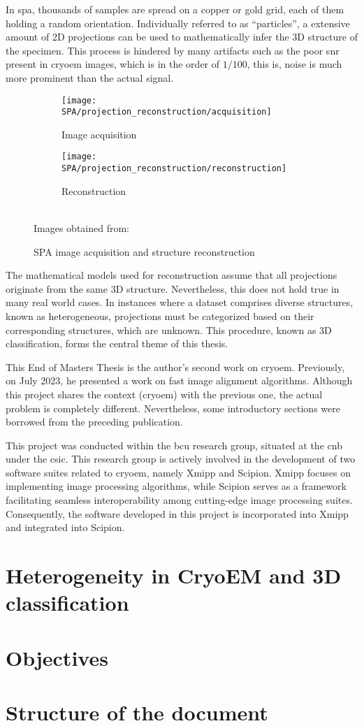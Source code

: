 \documentclass[../main.tex]{subfiles}
\begin{document}
In \gls{spa}, thousands of samples are spread on a copper or gold grid, each of them holding a random orientation. Individually referred to as ``particles'', a extensive amount of 2D projections can be used to mathematically infer the 3D structure of the specimen\cite{cryoem101}. This process is hindered by many artifacts such as the poor \gls{snr} present in \gls{cryoem} images, which is in the order of $1/100$, this is, noise is much more prominent than the actual signal.

\begin{figure}[hbp]
    \centering
    \begin{subfigure}[b]{0.45\textwidth}
         \centering
         \texttt{[image: SPA/projection\_reconstruction/acquisition]}
         \caption{Image acquisition}
    \end{subfigure}
    \hfill
    \begin{subfigure}[b]{0.45\textwidth}
         \centering
         \texttt{[image: SPA/projection\_reconstruction/reconstruction]}
         \caption{Reconstruction}
    \end{subfigure}\\
    Images obtained from: \cite{greg}
    \caption{SPA image acquisition and structure reconstruction}
    \label{fig:1:acquisition_reconstruction}
\end{figure}

The mathematical models used for reconstruction assume that all projections originate from the same 3D structure. Nevertheless, this does not hold true in many real world cases. In instances where a dataset comprises diverse structures, known as heterogeneous, projections must be categorized based on their corresponding structures, which are unknown. This procedure, known as 3D classification, forms the central theme of this thesis.

This End of Masters Thesis is the author's second work on \gls{cryoem}. Previously, on July 2023, he presented a work on fast image alignment algorithms\cite{zarrabeitia2023}. Although this project shares the context (\gls{cryoem}) with the previous one, the actual problem is completely different. Nevertheless, some introductory sections were borrowed from the preceding publication.

This project was conducted within the \gls{bcu} research group, situated at the \gls{cnb} under the \gls{csic}. This research group is actively involved in the development of two software suites related to \gls{cryoem}, namely Xmipp and Scipion. Xmipp focuses on implementing image processing algorithms, while Scipion serves as a framework facilitating seamless interoperability among cutting-edge image processing suites. Consequently, the software developed in this project is incorporated into Xmipp and integrated into Scipion.

\section{Heterogeneity in CryoEM and 3D classification}


\section{Objectives}


\section{Structure of the document}

\end{document}
